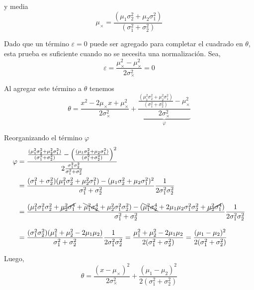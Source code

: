 \documentclass[article]{jss}
\begin{document}
\begin{appendix}
y media
\begin{equation}
 \mu_{\times} = \frac{(\mu_1\sigma_2^2 + \mu_2\sigma_1^2)}{(\sigma_1^2 + \sigma_2^2) }
\end{equation}

Dado que un t\'ermino $\varepsilon = 0$ puede ser agregado para completar el cuadrado en $\theta$, esta prueba es suficiente cuando no se necesita una normalizaci\'on.
Sea,
\begin{equation}
 \varepsilon = \frac{\mu_{\times}^2-\mu_{\times}^2}{2\sigma_{\times}^2} = 0
\end{equation}

Al agregar este t\'ermino a $\theta$ tenemos
\begin{equation}
 \theta = \frac{x^2 - 2\mu_{\times}x + \mu_{\times}^2 }{2\sigma_{\times}^2} + \underbrace{\frac{ \frac{(\mu_1^2\sigma_2^2 + \mu_2^2\sigma_1^2)}{(\sigma_1^2 + \sigma_2^2) } - \mu_{\times}^2}{2\sigma_{\times}^2}}_{\varphi}
\end{equation}

Reorganizando el t\'ermino $\varphi$
\begin{equation}
\begin{split}
\varphi & = \frac{\frac{(\mu_1^2\sigma_2^2 + \mu_2^2\sigma_1^2)}{(\sigma_1^2 + \sigma_2^2) } - \left(\frac{(\mu_1\sigma_2^2 + \mu_2\sigma_1^2)}{(\sigma_1^2 + \sigma_2^2) }\right)^2 }{2\frac{\sigma_1^2\sigma_2^2}{\sigma_1^2+\sigma_2^2}}  \\
& = \frac{(\sigma_1^2 + \sigma_2^2)(\mu_1^2\sigma_2^2 + \mu_2^2\sigma_1^2) - (\mu_1\sigma_2^2 + \mu_2\sigma_1^2)^2}{\sigma_1^2 + \sigma_2^2}\frac{1}{2\sigma_1^2\sigma_2^2} \\[0.3cm]
& = \frac{(\mu_1^2\sigma_1^2\sigma_2^2 + \cancel{\mu_2^2\sigma_1^4} + \bcancel{\mu_1^2\sigma_2^4} + \mu_2^2\sigma_1^2\sigma_2^2) - (\bcancel{\mu_1^2\sigma_2^4} + 2\mu_1\mu_2\sigma_1^2\sigma_2^2 + \cancel{\mu_2^2\sigma_1^4} )}{\sigma_1^2 + \sigma_2^2}  \frac{1}{2\sigma_1^2\sigma_2^2} \\[0.3cm]
& = \frac{(\sigma_1^2\sigma_2^2)(\mu_1^2 + \mu_2^2 - 2\mu_1\mu_2)}{\sigma_1^2 + \sigma_2^2}\frac{1}{2\sigma_1^2\sigma_2^2} = \frac{\mu_1^2 + \mu_2^2 - 2\mu_1\mu_2}{2(\sigma_1^2 + \sigma_2^2)} = \frac{(\mu_1 - \mu_2)^2}{2(\sigma_1^2 + \sigma_2^2)}
\end{split}
\end{equation}

Luego,
\begin{equation}
 \theta = \frac{(x-\mu_{\times})^2}{2\sigma_{\times}^2} + \frac{(\mu_1 - \mu_2)^2}{2(\sigma_1^2 + \sigma_2^2)}
\end{equation}


\end{appendix}
\end{document}
